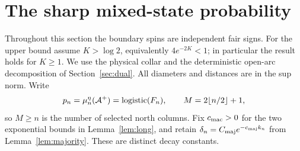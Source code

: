 \section{The sharp mixed-state probability}\label{sec:sharp}
Throughout this section the boundary spins are independent fair signs. For the upper bound assume $K>\log2$, equivalently $4e^{-2K}<1$; in particular the result holds for $K\ge1$. We use the physical collar and the deterministic open-arc decomposition of Section~\ref{sec:dual}. All diameters and distances are in the sup norm. Write
\[
 p_n=\mu_n^\eta(\mathcal A^+)=\operatorname{logistic}(F_n),\qquad
 M=2\lfloor n/2\rfloor+1,
\]
so $M\ge n$ is the number of selected north columns. Fix $c_{\rm mac}>0$ for the two exponential bounds in Lemma~\ref{lem:long}, and retain $\delta_n=C_{\rm maj}e^{-c_{\rm maj}k_n}$ from Lemma~\ref{lem:majority}. These are distinct decay constants.


